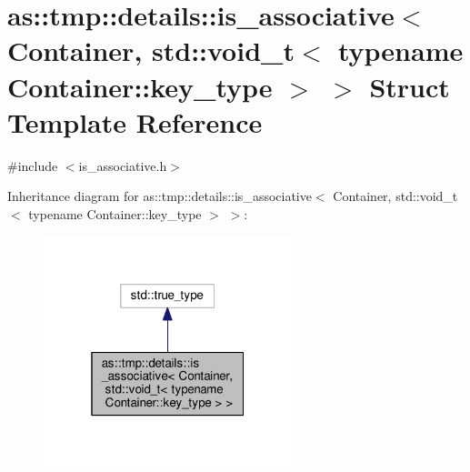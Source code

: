 \hypertarget{structas_1_1tmp_1_1details_1_1is__associative_3_01Container_00_01std_1_1void__t_3_01typename_01Container_1_1key__type_01_4_01_4}{}\section{as\+:\+:tmp\+:\+:details\+:\+:is\+\_\+associative$<$ Container, std\+:\+:void\+\_\+t$<$ typename Container\+:\+:key\+\_\+type $>$ $>$ Struct Template Reference}
\label{structas_1_1tmp_1_1details_1_1is__associative_3_01Container_00_01std_1_1void__t_3_01typename_01Container_1_1key__type_01_4_01_4}


{\ttfamily \#include $<$is\+\_\+associative.\+h$>$}



Inheritance diagram for as\+:\+:tmp\+:\+:details\+:\+:is\+\_\+associative$<$ Container, std\+:\+:void\+\_\+t$<$ typename Container\+:\+:key\+\_\+type $>$ $>$\+:
\nopagebreak
\begin{figure}[H]
\begin{center}
\leavevmode
\includegraphics[width=205pt]{structas_1_1tmp_1_1details_1_1is__associative_3_01Container_00_01std_1_1void__t_3_01typename_01C611a54dcc77bf996638028d6bc5cb78d}
\end{center}
\end{figure}


